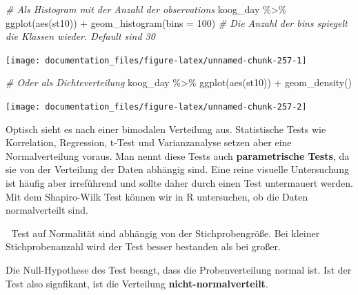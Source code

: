 \documentclass[
]{article}
\newenvironment{Shaded}{\begin{snugshade}}{\end{snugshade}}
\newcommand{\AttributeTok}[1]{\textcolor[rgb]{0.77,0.63,0.00}{#1}}
\newcommand{\CommentTok}[1]{\textcolor[rgb]{0.56,0.35,0.01}{\textit{#1}}}
\newcommand{\DecValTok}[1]{\textcolor[rgb]{0.00,0.00,0.81}{#1}}
\newcommand{\DocumentationTok}[1]{\textcolor[rgb]{0.56,0.35,0.01}{\textbf{\textit{#1}}}}
\newcommand{\FunctionTok}[1]{\textcolor[rgb]{0.00,0.00,0.00}{#1}}
\newcommand{\NormalTok}[1]{#1}
\newcommand{\SpecialCharTok}[1]{\textcolor[rgb]{0.00,0.00,0.00}{#1}}
\begin{document}
\begin{Shaded}
\begin{Highlighting}[]
\CommentTok{\# Als Histogram mit der Anzahl der observations}
\NormalTok{koog\_day }\SpecialCharTok{\%\textgreater{}\%}
  \FunctionTok{ggplot}\NormalTok{(}\FunctionTok{aes}\NormalTok{(st10)) }\SpecialCharTok{+}
  \FunctionTok{geom\_histogram}\NormalTok{(}\AttributeTok{bins =} \DecValTok{100}\NormalTok{) }\CommentTok{\# Die Anzahl der bins spiegelt die Klassen wieder. Default sind 30 }
\end{Highlighting}
\end{Shaded}

\begin{center}\texttt{[image: documentation\_files/figure-latex/unnamed-chunk-257-1]} \end{center}

\begin{Shaded}
\begin{Highlighting}[]

\CommentTok{\# Oder als Dichteverteilung}
\NormalTok{koog\_day }\SpecialCharTok{\%\textgreater{}\%}
  \FunctionTok{ggplot}\NormalTok{(}\FunctionTok{aes}\NormalTok{(st10)) }\SpecialCharTok{+}
  \FunctionTok{geom\_density}\NormalTok{()}
\end{Highlighting}
\end{Shaded}

\begin{center}\texttt{[image: documentation\_files/figure-latex/unnamed-chunk-257-2]} \end{center}

Optisch sieht es nach einer bimodalen Verteilung aus. Statistische Tests wie Korrelation, Regression, t-Test und Varianzanalyse setzen aber eine Normalverteilung voraus. Man nennt diese Tests auch \textbf{parametrische Tests}, da sie von der Verteilung der Daten abhängig sind. Eine reine visuelle Untersuchung ist häufig aber irreführend und sollte daher durch einen Test untermauert werden. Mit dem Shapiro-Wilk Test können wir in R untersuchen, ob die Daten normalverteilt sind.

🚨 Test auf Normalität sind abhängig von der Stichprobengröße. Bei kleiner Stichprobenanzahl wird der Test besser bestanden als bei großer.

Die Null-Hypothese des Test besagt, dass die Probenverteilung normal ist. Ist der Test also signfikant, ist die Verteilung \textbf{nicht-normalverteilt}.

\begin{Shaded}
\end{Shaded}
\end{document}
